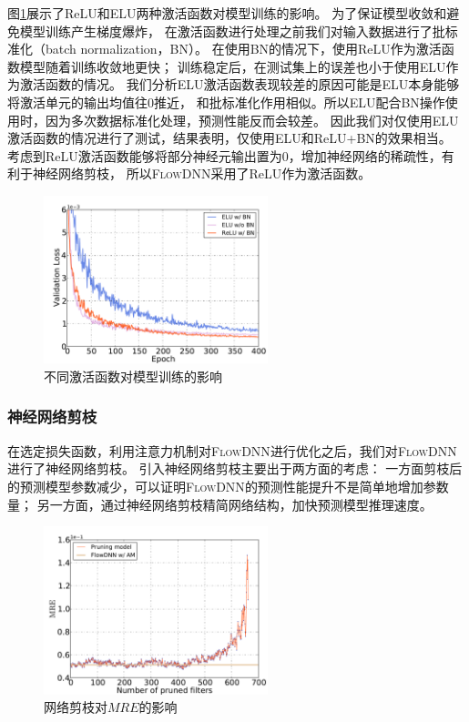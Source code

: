 图\ref{fig:activation}展示了ReLU和ELU两种激活函数对模型训练的影响。
为了保证模型收敛和避免模型训练产生梯度爆炸，
在激活函数进行处理之前我们对输入数据进行了批标准化（batch normalization，BN）。
在使用BN的情况下，使用ReLU作为激活函数模型随着训练收敛地更快；
训练稳定后，在测试集上的误差也小于使用ELU作为激活函数的情况。
我们分析ELU激活函数表现较差的原因可能是ELU本身能够将激活单元的输出均值往0推近，
和批标准化作用相似。所以ELU配合BN操作使用时，因为多次数据标准化处理，预测性能反而会较差。
因此我们对仅使用ELU激活函数的情况进行了测试，结果表明，仅使用ELU和ReLU+BN的效果相当。
考虑到ReLU激活函数能够将部分神经元输出置为0，增加神经网络的稀疏性，有利于神经网络剪枝，
所以\textsc{FlowDNN}采用了ReLU作为激活函数。

\begin{figure}[htp]
	\centering
	\includegraphics[width=0.58\textwidth]{./figures/data/activation_comp.pdf}
	\caption{不同激活函数对模型训练的影响}
	\label{fig:activation}	
\end{figure}


\subsubsection{神经网络剪枝}

在选定损失函数，利用注意力机制对\textsc{FlowDNN}进行优化之后，我们对\textsc{FlowDNN}进行了神经网络剪枝。
引入神经网络剪枝主要出于两方面的考虑：
一方面剪枝后的预测模型参数减少，可以证明\textsc{FlowDNN}的预测性能提升不是简单地增加参数量；
另一方面，通过神经网络剪枝精简网络结构，加快预测模型推理速度。

\begin{figure}[htp]
	\centering
	\includegraphics[width=0.58\textwidth]{./figures/data/pruning_result.pdf}
	\caption{网络剪枝对$MRE$的影响}
	\label{fig:pruning_result}	
\end{figure}

